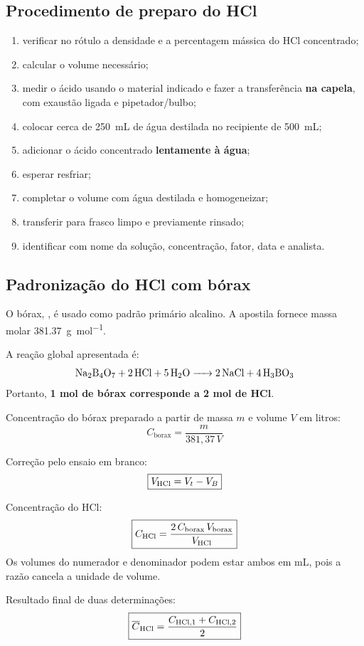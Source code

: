\documentclass[a4paper,12pt]{article}
\begin{document}
\subsection{Procedimento de preparo do HCl}

\begin{procedimento}
\begin{enumerate}[leftmargin=1.7em]
    \item verificar no rótulo a densidade e a percentagem mássica do HCl concentrado;
    \item calcular o volume necessário;
    \item medir o ácido usando o material indicado e fazer a transferência \textbf{na capela}, com exaustão ligada e pipetador/bulbo;
    \item colocar cerca de \SI{250}{\milli\liter} de água destilada no recipiente de \SI{500}{\milli\liter};
    \item adicionar o ácido concentrado \textbf{lentamente à água};
    \item esperar resfriar;
    \item completar o volume com água destilada e homogeneizar;
    \item transferir para frasco limpo e previamente rinsado;
    \item identificar com nome da solução, concentração, fator, data e analista.
\end{enumerate}
\end{procedimento}

\subsection{Padronização do HCl com bórax}

O bórax, , é usado como padrão primário alcalino. A apostila fornece massa molar \SI{381.37}{\gram\per\mole}.

A reação global apresentada é:
\[
\ce{Na2B4O7 + 2HCl + 5H2O -> 2NaCl + 4H3BO3}
\]
Portanto, \textbf{1 mol de bórax corresponde a 2 mol de HCl}.

\begin{conta}
Concentração do bórax preparado a partir de massa $m$ e volume $V$ em litros:
\[
\boxed{C_{\mathrm{borax}}=\frac{m}{381{,}37\,V}}
\]

Correção pelo ensaio em branco:
\[
\boxed{V_{\ce{HCl}}=V_t-V_B}
\]

Concentração do HCl:
\[
\boxed{C_{\ce{HCl}}=\frac{2\,C_{\mathrm{borax}}\,V_{\mathrm{borax}}}{V_{\ce{HCl}}}}
\]
Os volumes do numerador e denominador podem estar ambos em mL, pois a razão cancela a unidade de volume.

Resultado final de duas determinações:
\[
\boxed{\overline{C}_{\ce{HCl}}=\frac{C_{\ce{HCl},1}+C_{\ce{HCl},2}}{2}}
\]
\end{conta}
\end{document}
